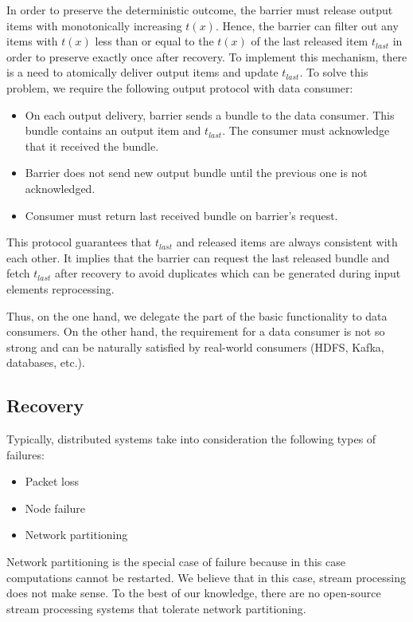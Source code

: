 In order to preserve the deterministic outcome, the barrier must release output items with monotonically increasing $t(x)$. Hence, the barrier can filter out any items with $t(x)$ less than or equal to the $t(x)$ of the last released item $t_{last}$ in order to preserve exactly once after recovery. To implement this mechanism, there is a need to atomically deliver output items and update $t_{last}$. To solve this problem, we require the following output protocol with data consumer: 

\begin{itemize}
    \item On each output delivery, barrier sends a bundle to the data consumer. This bundle contains an output item and $t_{last}$. The consumer must acknowledge that it received the bundle.
    \item Barrier does not send new output bundle until the previous one is not acknowledged.
    \item Consumer must return last received bundle on barrier's request.
\end{itemize}

This protocol guarantees that $t_{last}$ and released items are always consistent with each other. It implies that the barrier can request the last released bundle and fetch $t_{last}$ after recovery to avoid duplicates which can be generated during input elements reprocessing.

Thus, on the one hand, we delegate the part of the basic functionality to data consumers. On the other hand, the requirement for a data consumer is not so strong and can be naturally satisfied by real-world consumers (HDFS, Kafka, databases, etc.). 

\subsection{Recovery}

Typically, distributed systems take into consideration the following types of failures:
\begin{itemize}
    \item Packet loss
    \item Node failure
    \item Network partitioning
\end{itemize}

Network partitioning is the special case of failure because in this case computations cannot be restarted. We believe that in this case, stream processing does not make sense. To the best of our knowledge, there are no open-source stream processing systems that tolerate network partitioning.

